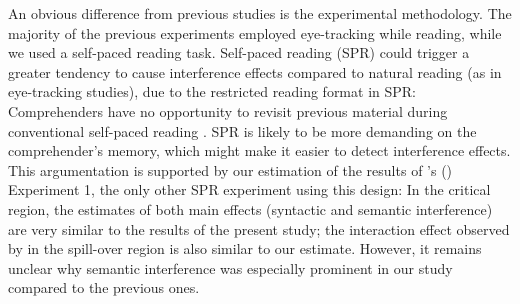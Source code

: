 \documentclass[a4paper, man, floatsintext]{apa7}
\begin{document}
An obvious difference from previous studies is the experimental methodology. The majority of the previous experiments employed eye-tracking while reading, while we used a self-paced reading task. Self-paced reading (SPR) could trigger a greater tendency to cause interference effects compared to natural reading (as in eye-tracking studies), due to the restricted reading format in SPR: Comprehenders have no opportunity to revisit previous material during conventional self-paced reading \citep[but see][]{BSPR}. SPR is likely to be more demanding on the comprehender's memory, which might make it easier to detect interference effects. This argumentation is supported by our estimation of the results of \citeauthor{vandyke07}'s (\citeyear{vandyke07}) Experiment 1, the only other SPR experiment using this design: %
In the critical region, the estimates of both main effects (syntactic and semantic interference) are very similar to the results of the present study; the interaction effect observed by \citeauthor{vandyke07} in the spill-over region is also similar to our estimate. However, it remains unclear why semantic interference was especially prominent in our study compared to the previous ones.
\end{document}
